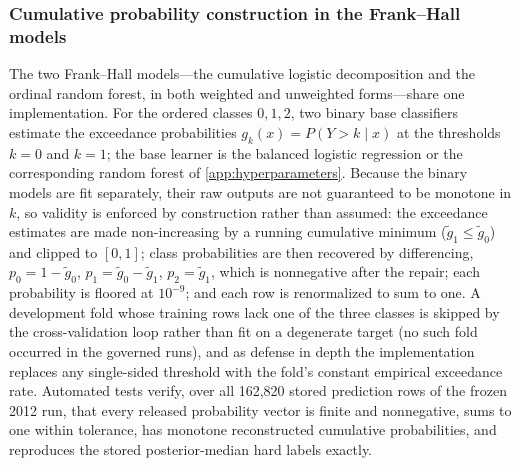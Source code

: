 \documentclass[11pt,letterpaper]{article}
\begin{document}
\subsubsection{Cumulative probability construction in the Frank--Hall models}
\label{sec:fh-construction}
The two Frank--Hall models---the cumulative logistic decomposition and the ordinal random forest, in both weighted and unweighted forms---share one implementation. For the ordered classes $0,1,2$, two binary base classifiers estimate the exceedance probabilities $g_k(x)=P(Y>k\mid x)$ at the thresholds $k=0$ and $k=1$; the base learner is the balanced logistic regression or the corresponding random forest of \cref{app:hyperparameters}. Because the binary models are fit separately, their raw outputs are not guaranteed to be monotone in $k$, so validity is enforced by construction rather than assumed: the exceedance estimates are made non-increasing by a running cumulative minimum ($\tilde g_1 \le \tilde g_0$) and clipped to $[0,1]$; class probabilities are then recovered by differencing, $p_0 = 1-\tilde g_0$, $p_1 = \tilde g_0-\tilde g_1$, $p_2 = \tilde g_1$, which is nonnegative after the repair; each probability is floored at $10^{-9}$; and each row is renormalized to sum to one. A development fold whose training rows lack one of the three classes is skipped by the cross-validation loop rather than fit on a degenerate target (no such fold occurred in the governed runs), and as defense in depth the implementation replaces any single-sided threshold with the fold's constant empirical exceedance rate. Automated tests verify, over all 162{,}820 stored prediction rows of the frozen 2012 run, that every released probability vector is finite and nonnegative, sums to one within tolerance, has monotone reconstructed cumulative probabilities, and reproduces the stored posterior-median hard labels exactly.
\end{document}
